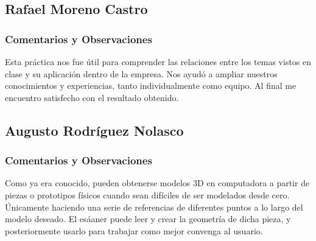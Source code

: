 \subsection{Rafael Moreno Castro}
\subsubsection{Comentarios y Observaciones}
Esta pr\'actica nos fue útil para comprender las relaciones entre los temas vistos en
clase y su aplicaci\'on dentro de la empresa. Nos ayud\'o a ampliar nuestros conocimientos
y experiencias, tanto individualmente como equipo. Al final me encuentro satisfecho con
el resultado obtenido.

\subsection{Augusto Rodr\'iguez Nolasco}
\subsubsection{Comentarios y Observaciones}
Como ya era conocido, pueden obtenerse modelos 3D en computadora a partir de piezas o prototipos f\'isicos cuando
sean dif\'iciles de ser modelados desde cero. \'Unicamente haciendo una serie de referencias de diferentes puntos
a lo largo del modelo deseado. El es\'aaner puede leer y crear la geometr\'ia de dicha pieza, y posteriormente usarlo
para trabajar como mejor convenga al usuario.